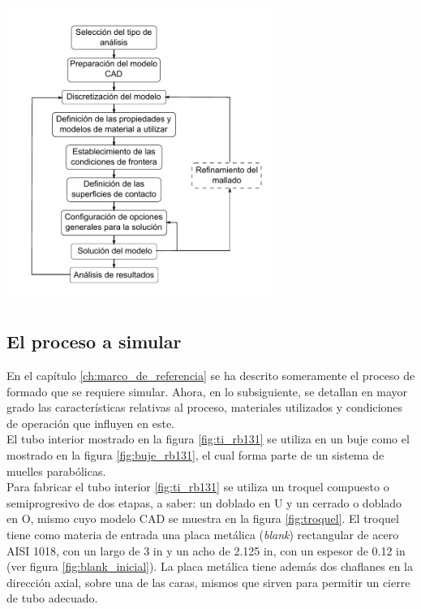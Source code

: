 \begin{center}
\includegraphics[width=0.65\textwidth]{src/ch3/metodologia_analisis_fem.pdf}
\label{fig:metodologia_analisis_fem}
\end{center}

\subsection{El proceso a simular}

En el capítulo \ref{ch:marco_de_referencia} se ha descrito someramente el proceso de formado que se requiere 
simular. Ahora, en lo subsiguiente, se detallan en mayor grado las características 
relativas al proceso, materiales utilizados y condiciones de operación que influyen en este. \\

El tubo interior mostrado en la figura \ref{fig:ti_rb131} se utiliza en un buje como 
el mostrado en la figura \ref{fig:buje_rb131}, el cual forma parte de un sistema de muelles 
parabólicas.\\

Para fabricar el tubo interior \ref{fig:ti_rb131} se utiliza un troquel compuesto o semiprogresivo 
de dos etapas, a saber: un doblado en U y un cerrado o doblado en O, mismo cuyo modelo CAD se muestra 
en la figura \ref{fig:troquel}. El troquel tiene como materia de entrada una placa metálica 
(\textit{blank}) rectangular de acero AISI 1018, con un largo de 3 in y un acho de 2.125 in, 
con un espesor de 0.12 in (ver figura \ref{fig:blank_inicial}). La placa metálica tiene además 
dos chaflanes en la dirección axial, sobre una de las caras, mismos que sirven para permitir un 
cierre de tubo adecuado.

